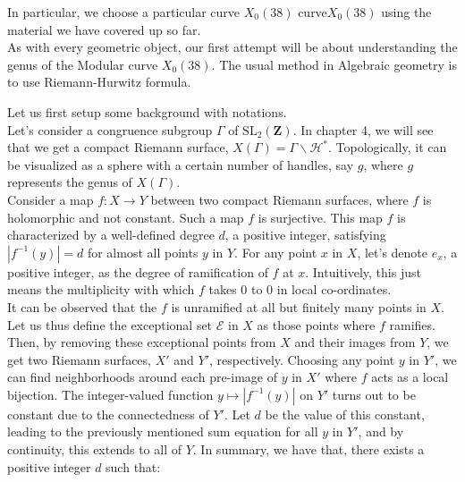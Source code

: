 In particular, we choose a particular curve $X_0(38)$ curve\hyperlink{https://beta.lmfdb.org/ModularCurve/Q/38.60.4.a.1/}{$X_0(38)$} using the material we have covered up so far.  
\\

As with every geometric object, our first attempt will be about understanding the genus of the Modular curve $X_0(38)$. The usual method in Algebraic geometry is to use Riemann-Hurwitz formula. 

Let us first setup some background with notations. \\

Let's consider a congruence subgroup \( \Gamma \) of \( \mathrm{SL}_{2}(\mathbf{Z}) \). In chapter 4, we will see that we get a compact Riemann surface, \( X(\Gamma) = \Gamma \backslash \mathcal{H}^{*} \). Topologically, it can be visualized as a sphere with a certain number of handles, say \( g \), where \( g \) represents the genus of \( X(\Gamma) \). \\

Consider a map \( f: X \rightarrow Y \) between two compact Riemann surfaces, where \( f \) is holomorphic and not constant. Such a map \( f \) is surjective. This map \( f \) is characterized by a well-defined degree \( d \), a positive integer, satisfying \( |f^{-1}(y)| = d \) for almost all points \( y \) in \( Y \). For any point \( x \) in \( X \), let's denote \( e_{x} \), a positive integer, as the degree of ramification of \( f \) at \( x \). Intuitively, this just means the multiplicity with which $f$ takes 0 to 0 in local co-ordinates. \\


It can be observed that the $f$ is unramified at all but finitely many points in $X$. Let us thus define the exceptional set \( \mathcal{E} \) in \( X \) as those points where \( f \) ramifies. Then, by removing these exceptional points from \( X \) and their images from \( Y \), we get two Riemann surfaces, \( X' \) and \( Y' \), respectively. Choosing any point \( y \) in \( Y' \), we can find neighborhoods around each pre-image of \( y \) in \( X' \) where \( f \) acts as a local bijection. The integer-valued function \( y \mapsto |f^{-1}(y)| \) on \( Y' \) turns out to be constant due to the connectedness of \( Y' \). Let \( d \) be the value of this constant, leading to the previously mentioned sum equation for all \( y \) in \( Y' \), and by continuity, this extends to all of \( Y \).
In summary, we have that, there exists a positive integer \( d \) such that:

